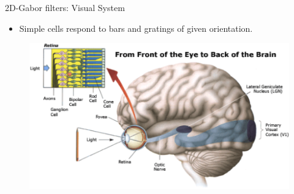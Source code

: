 \begin{frame}{2D-Gabor filters: Visual System}
\begin{itemize}
\item Simple cells respond to bars and gratings of given
orientation.
\end{itemize}
\begin{figure}
\includegraphics[scale=0.59]{Figures/visualSystem.png}
\end{figure}
\end{frame}

